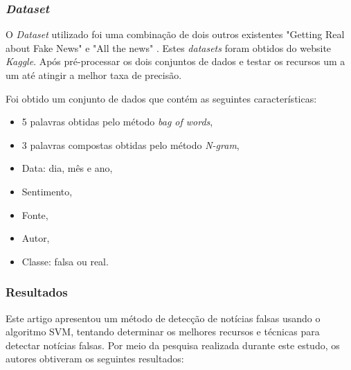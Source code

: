 \subsubsection{\textit{Dataset}}

O \textit{Dataset} utilizado foi uma combinação de dois outros existentes  "Getting Real about
Fake News" \cite{fakenews2016} e "All the news" \cite{allthenews2017}. 
Estes \textit{datasets} foram obtidos do website \textit{Kaggle}. 
Após pré-processar os dois conjuntos de dados e testar os recursos um a um até atingir a melhor taxa de precisão. 

Foi obtido um conjunto de dados que contém as seguintes características:

\begin{itemize}
    \item 5 palavras obtidas pelo método \textit{bag of words},
    \item 3 palavras compostas obtidas pelo método \textit{N-gram},
    \item Data: dia, mês e ano,
    \item Sentimento,
    \item Fonte,
    \item Autor,
    \item Classe: falsa ou real. \\
\end{itemize}

\subsubsection{Resultados}
Este artigo apresentou um método de detecção de notícias falsas usando o algoritmo SVM, tentando determinar os melhores recursos e técnicas para detectar notícias falsas. Por meio da pesquisa realizada durante este estudo, os autores obtiveram os seguintes resultados:

